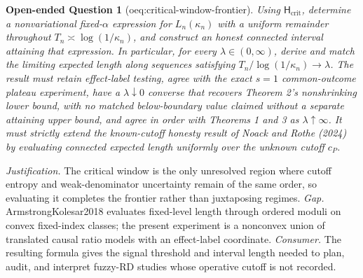 \documentclass{article}
\newtheorem{openendedquestion}{Open-ended Question}
\begin{document}
\begin{openendedquestion}[oeq:critical-window-frontier]\label{oeq:critical-window-frontier}
Using \(\mathsf H_{\mathrm{crit}}\), determine a nonvariational
fixed-\(\alpha\) expression for \(L_n(\kappa_n)\) with a uniform
remainder throughout \(T_n\asymp\log(1/\kappa_n)\), and construct an
honest connected interval attaining that expression.  In particular,
for every \(\lambda\in(0,\infty)\), derive and match the limiting
expected length along sequences satisfying
\(T_n/\log(1/\kappa_n)\to\lambda\).  The result must retain
effect-label testing, agree with the exact \(s=1\) common-outcome
plateau experiment, have a \(\lambda\downarrow0\) converse that
recovers Theorem 2's nonshrinking lower bound, with no matched
below-boundary value claimed without a separate attaining upper bound,
and agree in order with Theorems 1 and 3 as
\(\lambda\uparrow\infty\).  It must strictly extend the known-cutoff
honesty result of Noack and Rothe (2024) by evaluating connected
expected length uniformly over the unknown cutoff \(c_P\).
\end{openendedquestion}
\par\smallskip\noindent \textit{Justification.} The critical window is the only unresolved region where cutoff entropy and weak-denominator uncertainty remain of the same order, so evaluating it completes the frontier rather than juxtaposing regimes. \textit{Gap.} ArmstrongKolesar2018 evaluates fixed-level length through ordered moduli on convex fixed-index classes; the present experiment is a nonconvex union of translated causal ratio models with an effect-label coordinate. \textit{Consumer.} The resulting formula gives the signal threshold and interval length needed to plan, audit, and interpret fuzzy-RD studies whose operative cutoff is not recorded.
\end{document}
